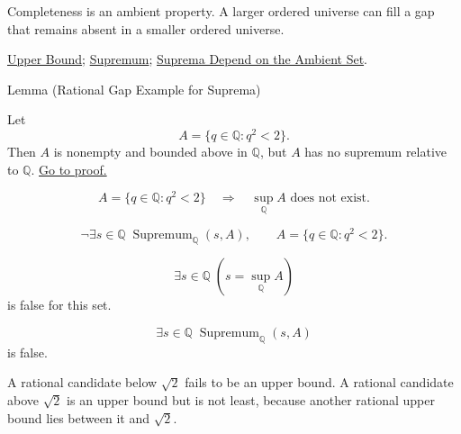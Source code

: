\begin{remark*}[Interpretation]
Completeness is an ambient property. A larger ordered universe can fill a gap that remains absent in a smaller ordered universe.
\end{remark*}

\begin{dependencies}
\hyperref[def:upper-bound]{Upper Bound};
\hyperref[def:supremum]{Supremum};
\hyperref[prop:suprema-ambient-set]{Suprema Depend on the Ambient Set}.
\end{dependencies}



\begin{lemmabox}{Lemma (Rational Gap Example for Suprema)}
\begin{lemma}
\label{lem:rational-gap-suprema}
Let
\[
  A=\{q\in\mathbb{Q}:q^2<2\}.
\]
Then $A$ is nonempty and bounded above in $\mathbb{Q}$, but $A$ has no supremum relative to $\mathbb{Q}$.
\hyperref[prf:rational-gap-suprema]{Go to proof.}
\end{lemma}
\end{lemmabox}

\begin{remark*}
\[
A=\{q\in\mathbb{Q}:q^2<2\}
\quad\Longrightarrow\quad
\sup_{\mathbb{Q}} A\text{ does not exist}.
\]
\end{remark*}

\begin{remark*}
\[
\neg\exists s\in\mathbb{Q}\;\operatorname{Supremum}_{\mathbb{Q}}(s,A),
\qquad
A=\{q\in\mathbb{Q}:q^2<2\}.
\]
\end{remark*}

\begin{remark*}
\[
\exists s\in\mathbb{Q}\;(s=\sup_{\mathbb{Q}}A)
\]
is false for this set.
\end{remark*}

\begin{remark*}
\[
\exists s\in\mathbb{Q}\;\operatorname{Supremum}_{\mathbb{Q}}(s,A)
\]
is false.
\end{remark*}

\begin{remark*}
A rational candidate below $\sqrt{2}$ fails to be an upper bound. A rational candidate above $\sqrt{2}$ is an upper bound but is not least, because another rational upper bound lies between it and $\sqrt{2}$.
\end{remark*}

